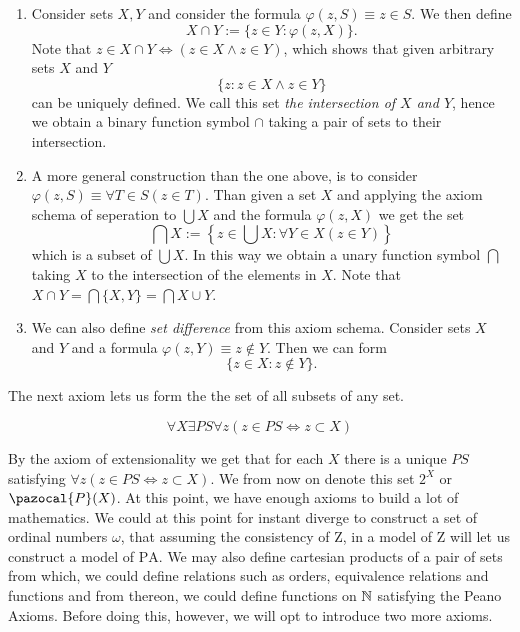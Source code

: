 \begin{example}
    \begin{enumerate}
        \item Consider sets $X,Y$ and consider the formula $\varphi(z,S) \equiv z\in S$. We then define 
        $$X\cap Y := \{ z\in Y : \varphi(z,X)\}.$$
        Note that $z\in X\cap Y\iff (z\in X\wedge z\in Y)$, which shows that given arbitrary sets $X$ and $Y$
        $$\{z : z\in X\wedge z\in Y\}$$
        can be uniquely defined. We call this set \textit{the intersection of $X$ and $Y$}, hence we obtain a binary function symbol $\cap$ taking a pair of sets to their intersection.
        \item A more general construction than the one above, is to consider $\varphi(z,S) \equiv \forall T\in S(z\in T)$. Than given a set $X$ and applying the axiom schema of seperation to $\bigcup X$ and the formula $\varphi(z,X)$ we get the set 
        $$ \bigcap X := \left\{z \in \bigcup X : \forall Y \in X(z\in Y)\right\}$$
        which is a subset of $\bigcup X$. In this way we obtain a unary function symbol $\bigcap$ taking $X$ to the intersection of the elements in $X$. Note that $X\cap Y = \bigcap\{X, Y\} = \bigcap X\cup Y$.
        \item We can also define \textit{set difference}  from this axiom schema. Consider sets $X$ and $Y$ and a formula $\varphi(z,Y) \equiv z\notin Y$. Then we can form
        $$ \{z\in X : z\notin Y\}.$$
    \end{enumerate}
\end{example}
The next axiom lets us form the the set of all subsets of any set. 
\begin{axioms}
    $$\forall X\exists PS\forall z(z\in PS\iff z \subset X)$$
\end{axioms}
By the axiom of extensionality we get that for each $X$ there is a unique $PS$ satisfying $\forall z(z \in PS \iff z\subset X)$. We from now on denote this set $2^X$ or $\pazocal{P}(X)$. At this point, we have enough axioms to build a lot of mathematics. We could at this point for instant diverge to construct a set of ordinal numbers $\omega$, that assuming the consistency of $\mathrm{Z}$, in a model of $\mathrm{Z}$ will let us construct a model of $\mathrm{PA}$. We may also define cartesian products of a pair of sets from which, we could define relations such as orders, equivalence relations and functions and from thereon, we could define functions on $\mathbb{N}$ satisfying the Peano Axioms. Before doing this, however, we will opt to introduce two more axioms.
